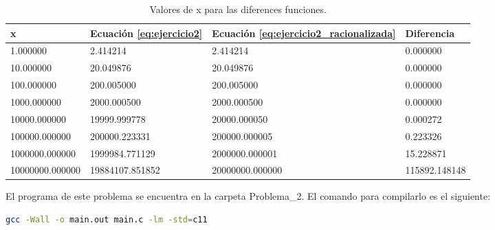 \begin{table}[H]
    \centering
    \begin{tabular}{llll} \hline
        \textbf{x}      & \textbf{Ecuación \ref{eq:ejercicio2}} & \textbf{Ecuación \ref{eq:ejercicio2_racionalizada}} & \textbf{Diferencia} \\ \hline
        1.000000        & 2.414214                              & 2.414214                                            & 0.000000            \\
        10.000000       & 20.049876                             & 20.049876                                           & 0.000000            \\
        100.000000      & 200.005000                            & 200.005000                                          & 0.000000            \\
        1000.000000     & 2000.000500                           & 2000.000500                                         & 0.000000            \\
        10000.000000    & 19999.999778                          & 20000.000050                                        & 0.000272            \\
        100000.000000   & 200000.223331                         & 200000.000005                                       & 0.223326            \\
        1000000.000000  & 1999984.771129                        & 2000000.000001                                      & 15.228871           \\
        10000000.000000 & 19884107.851852                       & 20000000.000000                                     & 115892.148148       \\ \hline
    \end{tabular}
    \caption{Valores de x para las diferences funciones.}
    \label{table:problema2}
\end{table}

El programa de este problema se encuentra en la carpeta \textcolor{citecolor}{Problema\_2}. El comando para compilarlo es el siguiente:

\begin{lstlisting}[language=bash]
    gcc -Wall -o main.out main.c -lm -std=c11
\end{lstlisting}
